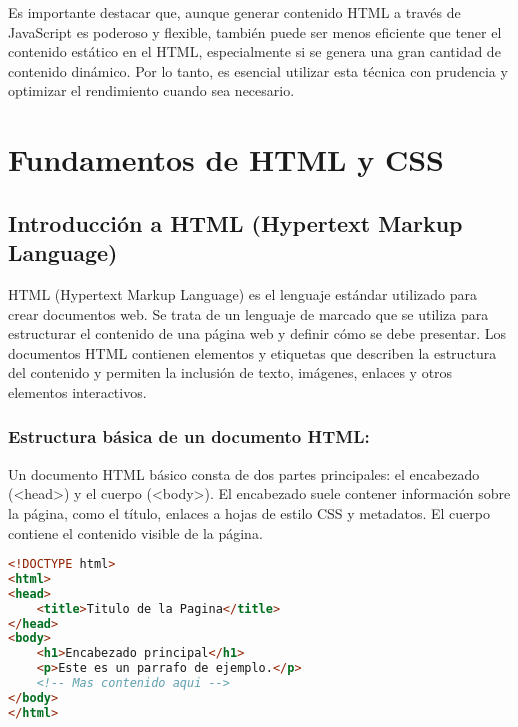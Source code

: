 \documentclass[executivepaper]{article}
\begin{document}
Es importante destacar que, aunque generar contenido HTML a través de JavaScript es poderoso y flexible, también puede ser menos eficiente que tener el contenido estático en el HTML, especialmente si se genera una gran cantidad de contenido dinámico. Por lo tanto, es esencial utilizar esta técnica con prudencia y optimizar el rendimiento cuando sea necesario.

\newpage
\section{Fundamentos de HTML y CSS}
\subsection{Introducción a HTML (Hypertext Markup Language)}

HTML (Hypertext Markup Language) es el lenguaje estándar utilizado para crear documentos web. Se trata de un lenguaje de marcado que se utiliza para estructurar el contenido de una página web y definir cómo se debe presentar. Los documentos HTML contienen elementos y etiquetas que describen la estructura del contenido y permiten la inclusión de texto, imágenes, enlaces y otros elementos interactivos.

\subsubsection*{Estructura básica de un documento HTML:}

Un documento HTML básico consta de dos partes principales: el encabezado (<head>) y el cuerpo (<body>). El encabezado suele contener información sobre la página, como el título, enlaces a hojas de estilo CSS y metadatos. El cuerpo contiene el contenido visible de la página.

\begin{lstlisting}[language=HTML]
<!DOCTYPE html>
<html>
<head>
    <title>Titulo de la Pagina</title>
</head>
<body>
    <h1>Encabezado principal</h1>
    <p>Este es un parrafo de ejemplo.</p>
    <!-- Mas contenido aqui -->
</body>
</html>  
\end{lstlisting}
\end{document}
